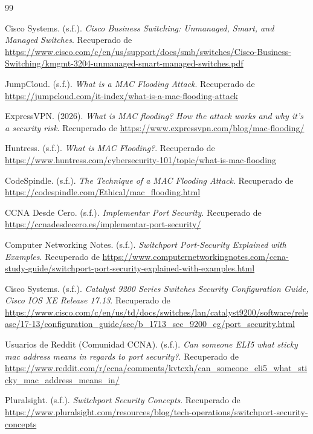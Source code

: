 \documentclass[a4paper,12pt]{article}
\begin{document}
\begin{thebibliography}{99}

Cisco Systems. (s.f.). \textit{Cisco Business Switching: Unmanaged, Smart, and Managed Switches}. Recuperado de \url{https://www.cisco.com/c/en/us/support/docs/smb/switches/Cisco-Business-Switching/kmgmt-3204-unmanaged-smart-managed-switches.pdf}

JumpCloud. (s.f.). \textit{What is a MAC Flooding Attack}. Recuperado de \url{https://jumpcloud.com/it-index/what-is-a-mac-flooding-attack}

ExpressVPN. (2026). \textit{What is MAC flooding? How the attack works and why it's a security risk}. Recuperado de \url{https://www.expressvpn.com/blog/mac-flooding/}

Huntress. (s.f.). \textit{What is MAC Flooding?}. Recuperado de \url{https://www.huntress.com/cybersecurity-101/topic/what-is-mac-flooding}

CodeSpindle. (s.f.). \textit{The Technique of a MAC Flooding Attack}. Recuperado de \url{https://codespindle.com/Ethical/mac_flooding.html}

CCNA Desde Cero. (s.f.). \textit{Implementar Port Security}. Recuperado de \url{https://ccnadesdecero.es/implementar-port-security/}

Computer Networking Notes. (s.f.). \textit{Switchport Port-Security Explained with Examples}. Recuperado de \url{https://www.computernetworkingnotes.com/ccna-study-guide/switchport-port-security-explained-with-examples.html}

Cisco Systems. (s.f.). \textit{Catalyst 9200 Series Switches Security Configuration Guide, Cisco IOS XE Release 17.13}. Recuperado de \url{https://www.cisco.com/c/en/us/td/docs/switches/lan/catalyst9200/software/release/17-13/configuration_guide/sec/b_1713_sec_9200_cg/port_security.html}

Usuarios de Reddit (Comunidad CCNA). (s.f.). \textit{Can someone ELI5 what sticky mac address means in regards to port security?}. Recuperado de \url{https://www.reddit.com/r/ccna/comments/kvtcxh/can_someone_eli5_what_sticky_mac_address_means_in/}

Pluralsight. (s.f.). \textit{Switchport Security Concepts}. Recuperado de \url{https://www.pluralsight.com/resources/blog/tech-operations/switchport-security-concepts}


\end{thebibliography}
\end{document}
